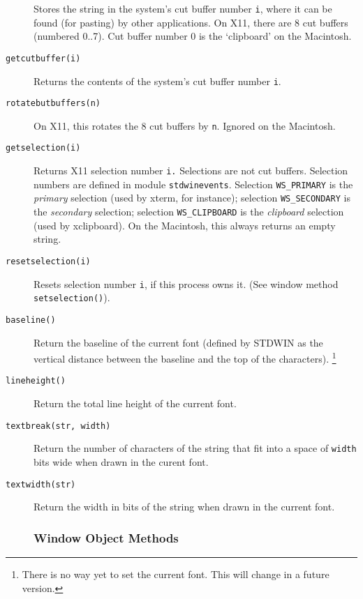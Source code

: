 \begin{description}
Stores the string in the system's cut buffer number
{\tt i},
where it can be found (for pasting) by other applications.
On X11, there are 8 cut buffers (numbered 0..7).
Cut buffer number 0 is the `clipboard' on the Macintosh.
\item[{\tt getcutbuffer(i)}]
Returns the contents of the system's cut buffer number
{\tt i}.
\item[{\tt rotatebutbuffers(n)}]
On X11, this rotates the 8 cut buffers by
{\tt n}.
Ignored on the Macintosh.
\item[{\tt getselection(i)}]
Returns X11 selection number
{\tt i.}
Selections are not cut buffers.
Selection numbers are defined in module
{\tt stdwinevents}.
Selection {\tt WS\_PRIMARY} is the
{\em primary}
selection (used by
xterm,
for instance);
selection {\tt WS\_SECONDARY} is the
{\em secondary}
selection; selection {\tt WS\_CLIPBOARD} is the
{\em clipboard}
selection (used by
xclipboard).
On the Macintosh, this always returns an empty string.
\item[{\tt resetselection(i)}]
Resets selection number
{\tt i},
if this process owns it.
(See window method
{\tt setselection()}).
\item[{\tt baseline()}]
Return the baseline of the current font (defined by STDWIN as the
vertical distance between the baseline and the top of the
characters).%
\footnote{
There is no way yet to set the current font.
This will change in a future version.
}
\item[{\tt lineheight()}]
Return the total line height of the current font.
\item[{\tt textbreak(str, width)}]
Return the number of characters of the string that fit into a space of
{\tt width}
bits wide when drawn in the curent font.
\item[{\tt textwidth(str)}]
Return the width in bits of the string when drawn in the current font.
\subsubsection{Window Object Methods}
\end{description}

